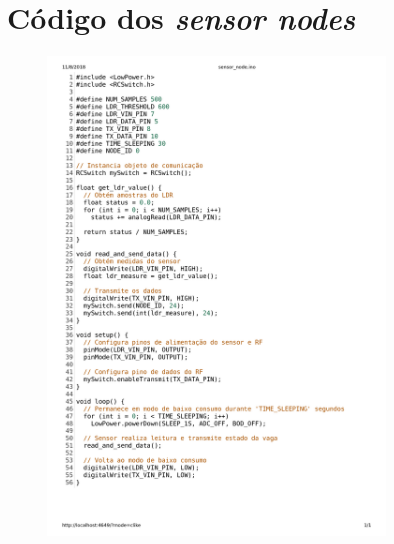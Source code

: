 \documentclass[oneside,openright,12pt]{ufsm_2015} %
\begin{document}
	
	
	
	\apendice %

\chapter{Código dos \textit{sensor nodes}}
\label{apendice:sensor-nodes-code}
        \begin{figure}[H]
        \centering
        \includegraphics[width=0.8\textwidth]{figuras/sensor_node.png}
        \vspace{\baselineskip} %
\end{figure}
\end{document}
